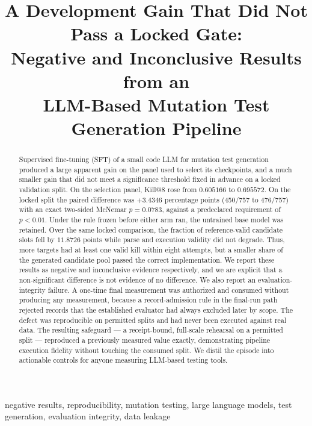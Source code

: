 \documentclass[10pt,conference]{IEEEtran}
\makeatletter
\newcommand{\killk}[1]{Kill@#1}
\makeatother
\begin{document}
\title{A Development Gain That Did Not Pass a Locked Gate:\\
Negative and Inconclusive Results from an\\
LLM-Based Mutation Test Generation Pipeline}

\author{\IEEEauthorblockN{}\IEEEauthorblockA{}}

\maketitle

\begin{abstract}
Supervised fine-tuning (SFT) of a small code LLM for mutation test generation
produced a large apparent gain on the panel used to select its checkpoints, and
a much smaller gain that did not meet a significance threshold fixed in advance
on a locked validation split. On the selection panel, \killk{8} rose from
$0.605166$ to $0.695572$. On the locked split the paired difference was
$+3.4346$ percentage points (450/757 to 476/757) with an exact two-sided
McNemar $p = 0.0783$, against a predeclared requirement of $p < 0.01$. Under
the rule frozen before either arm ran, the untrained base model was retained.
Over the same locked comparison, the fraction of reference-valid candidate
slots fell by $11.8726$ points while parse and execution validity did not
degrade. Thus, more targets had at least one valid kill within eight attempts,
but a smaller share of the generated candidate pool passed the correct
implementation. We report these results as negative and
inconclusive evidence respectively, and we are explicit that a non-significant
difference is not evidence of no difference. We also report an evaluation-
integrity failure. A one-time final measurement was authorized and consumed
without producing any measurement, because a record-admission rule in the
final-run path rejected records that the established evaluator had always
excluded later by scope. The defect was reproducible on permitted splits and
had never been executed against real data. The resulting safeguard --- a
receipt-bound, full-scale rehearsal on a permitted split --- reproduced a
previously measured value exactly, demonstrating pipeline execution fidelity
without touching the consumed split. We distil the episode into actionable
controls for anyone measuring LLM-based testing tools.
\end{abstract}

\begin{IEEEkeywords}
negative results, reproducibility, mutation testing, large language models,
test generation, evaluation integrity, data leakage
\end{IEEEkeywords}
\end{document}
